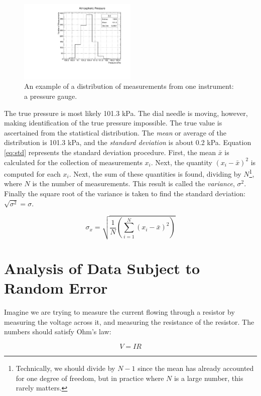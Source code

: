 \documentclass[12pt]{article}
\begin{document}
\begin{figure}
\centering
\includegraphics[angle=0,width=0.5\textwidth]{figures/histo.pdf}
\caption{\label{fig:histo} An example of a distribution of measurements from one instrument: a pressure gauge.}
\end{figure}

The true pressure is most likely 101.3 kPa.  The dial needle is moving, however, making identification of the true pressure impossible.  The true value is ascertained from the statistical distribution.  The \textit{mean} or average of the distribution is 101.3 kPa, and the \textit{standard deviation} is about 0.2 kPa.  Equation \ref{eq:std} represents the standard deviation procedure.  First, the mean $\bar{x}$ is calculated for the collection of measurements $x_i$.  Next, the quantity $(x_i - \bar{x})^2$ is computed for each $x_i$.  Next, the sum of these quantities is found, dividing by $N$\footnote{Technically, we should divide by $N-1$ since the mean has already accounted for one degree of freedom, but in practice where $N$ is a large number, this rarely matters.}, where $N$ is the number of measurements.  This result is called the \textit{variance}, $\sigma^2$.  Finally the square root of the variance is taken to find the standard deviation: $\sqrt{\sigma^2} = \sigma$.

\begin{equation}
\sigma_x = \sqrt{\frac{1}{N} \left( \sum_{i=1}^N (x_i - \bar{x})^2\right)} \label{eq:std}
\end{equation}

\section{Analysis of Data Subject to Random Error}

Imagine we are trying to measure the current flowing through a resistor by measuring the voltage across it, and measuring the resistance of the resistor.  The numbers should satisfy Ohm's law:

\begin{equation}
V = IR
\end{equation}
\end{document}
